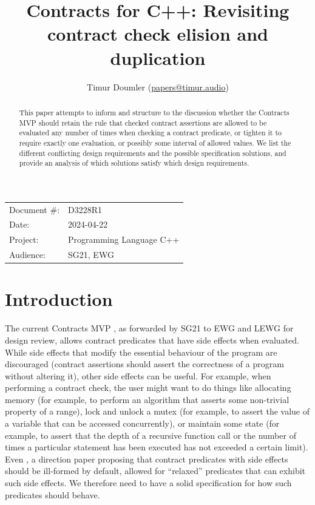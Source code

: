 

 \usepackage[bottom]{footmisc} 

 \usepackage{longtable}



\title{Contracts for C++: Revisiting contract check elision and duplication}
\author{ Timur Doumler \small(\href{mailto:papers@timur.audio}{papers@timur.audio}) 
}
\date{}
\maketitle

\begin{tabular}{ll}
Document \#: & D3228R1 \\
Date: &2024-04-22 \\
Project: & Programming Language C++ \\
Audience: & SG21, EWG
\end{tabular}

\begin{abstract}
This paper attempts to inform and structure to the discussion whether the Contracts MVP should retain the rule that checked contract assertions are allowed to be evaluated any number of times when checking a contract predicate, or tighten it to require exactly one evaluation, or possibly some interval of allowed values. We list the different conflicting design requirements and the possible specification solutions, and provide an analysis of which solutions satisfy which design requirements.
\end{abstract}


\section{Introduction}
\label{sec:intro}

The current Contracts MVP \cite{P2900R6}, as forwarded by SG21 to EWG and LEWG for design review, allows contract predicates that have side effects when evaluated. While side effects that modify the essential behaviour of the program are discouraged (contract assertions should assert the correctness of a program without altering it), other side effects can be useful. For example, when performing a contract check, the user might want to do things like allocating memory (for example, to perform an algorithm that asserts some non-trivial property of a range), lock and unlock a mutex (for example, to assert the value of a variable that can be accessed concurrently), or maintain some state (for example, to assert that the depth of a recursive function call or the number of times a particular statement has been executed has not exceeded a certain limit). Even \cite{P2680R1}, a direction paper proposing that contract predicates with side effects should be ill-formed by default, allowed for ``relaxed'' predicates that can exhibit such side effects. We therefore need to have a solid specification for how such predicates should behave.

